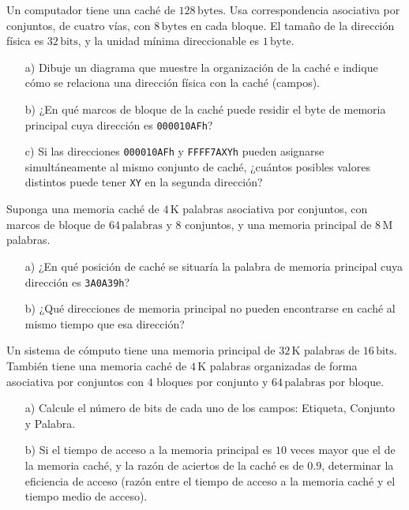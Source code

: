 \begin{ejercicio}
    Un computador tiene una caché de \(128 \, \text{bytes}\). Usa correspondencia asociativa por conjuntos, de cuatro vías, con \(8 \, \text{bytes}\) en cada bloque. El tamaño de la dirección física es \(32 \, \text{bits}\), y la unidad mínima direccionable es \(1 \, \text{byte}\).
    \begin{itemize}
        \item[a)] Dibuje un diagrama que muestre la organización de la caché e indique cómo se relaciona una dirección física con la caché (campos).
        \item[b)] ¿En qué marcos de bloque de la caché puede residir el byte de memoria principal cuya dirección es \texttt{000010AFh}?
        \item[c)] Si las direcciones \texttt{000010AFh} y \texttt{FFFF7AXYh} pueden asignarse simultáneamente al mismo conjunto de caché, ¿cuántos posibles valores distintos puede tener \texttt{XY} en la segunda dirección?
    \end{itemize}
\end{ejercicio}

\begin{ejercicio}
    Suponga una memoria caché de \(4 \, \text{K}\) palabras asociativa por conjuntos, con marcos de bloque de \(64 \, \text{palabras}\) y \(8\) conjuntos, y una memoria principal de \(8 \, \text{M}\) palabras.
    \begin{itemize}
        \item[a)] ¿En qué posición de caché se situaría la palabra de memoria principal cuya dirección es \texttt{3A0A39h}?
        \item[b)] ¿Qué direcciones de memoria principal no pueden encontrarse en caché al mismo tiempo que esa dirección?
    \end{itemize}
\end{ejercicio}

\begin{ejercicio}
    Un sistema de cómputo tiene una memoria principal de \(32 \, \text{K}\) palabras de \(16 \, \text{bits}\). También tiene una memoria caché de \(4 \, \text{K}\) palabras organizadas de forma asociativa por conjuntos con \(4\) bloques por conjunto y \(64 \, \text{palabras}\) por bloque.
    \begin{itemize}
        \item[a)] Calcule el número de bits de cada uno de los campos: Etiqueta, Conjunto y Palabra.
        \item[b)] Si el tiempo de acceso a la memoria principal es \(10\) veces mayor que el de la memoria caché, y la razón de aciertos de la caché es de \(0.9\), determinar la eficiencia de acceso (razón entre el tiempo de acceso a la memoria caché y el tiempo medio de acceso).
    \end{itemize}
\end{ejercicio}

